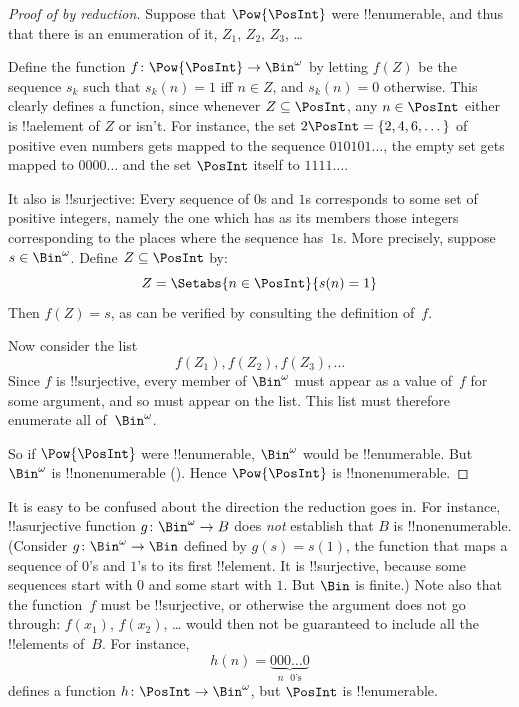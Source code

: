 \begin{proof}[Proof of {} by reduction]
Suppose that $\Pow{\PosInt}$ were !!{enumerable}, and thus that
there is an enumeration of it, $Z_{1}$, $Z_{2}$, $Z_{3}$, \dots

Define the function $f \colon \Pow{\PosInt} \to \Bin^\omega$ by letting
$f(Z)$ be the sequence $s_{k}$ such that $s_{k}(n) = 1$ iff $n \in Z$,
and $s_k(n) = 0$ otherwise.  This clearly defines a function, since
whenever $Z \subseteq \PosInt$, any $n \in \PosInt$ either is
!!a{element} of $Z$ or isn't.  For instance, the set $2\PosInt = \{2,
4, 6, \dots\}$ of positive even numbers gets mapped to the sequence
$010101\dots$, the empty set gets mapped to $0000\dots$ and the set
$\PosInt$ itself to $1111\dots$.

It also is !!{surjective}: Every sequence of $0$s and $1$s corresponds
to some set of positive integers, namely the one which has as its
members those integers corresponding to the places where the sequence
has~$1$s. More precisely, suppose $s \in \Bin^\omega$.  Define $Z
\subseteq \PosInt$ by:
\[
Z = \Setabs{n \in \PosInt}{s(n) = 1}
\]
Then $f(Z) = s$, as can be verified by consulting the definition
of~$f$.

Now consider the list
\[
f(Z_1), f(Z_2), f(Z_3), \dots
\]
Since $f$ is !!{surjective}, every member of $\Bin^\omega$ must
appear as a value of~$f$ for some argument, and so must appear on the
list. This list must therefore enumerate all of~$\Bin^\omega$.

So if $\Pow{\PosInt}$ were !!{enumerable}, $\Bin^\omega$ would be
!!{enumerable}.  But $\Bin^\omega$ is !!{nonenumerable}
(). Hence $\Pow{\PosInt}$ is
!!{nonenumerable}.
\end{proof}

\begin{explain}
It is easy to be confused about the direction the reduction goes in.
For instance, !!a{surjective} function $g \colon \Bin^\omega \to B$
does \emph{not} establish that $B$ is !!{nonenumerable}.  (Consider $g
\colon \Bin^\omega \to \Bin$ defined by $g(s) = s(1)$, the function
that maps a sequence of $0$'s and $1$'s to its first !!{element}.  It
is !!{surjective}, because some sequences start with $0$ and some start
with $1$. But $\Bin$ is finite.)  Note also that the function~$f$ must
be !!{surjective}, or otherwise the argument does not go through:
$f(x_1)$, $f(x_2)$, \dots{} would then not be guaranteed to include
all the !!{element}s of~$B$. For instance, 
\[
h(n) = \underbrace{000\dots0}_{\text{$n$ $0$'s}}
\]
defines a function $h\colon \PosInt \to
\Bin^\omega$, but $\PosInt$ is !!{enumerable}.
\end{explain}

